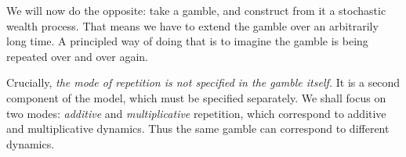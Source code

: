We will now do the opposite: take a gamble, and construct from it a stochastic wealth process.
That means we have to extend the gamble over an arbitrarily long time. A principled way of doing that
is to imagine the gamble is being repeated over and over again. 

%
%

Crucially, {\it the mode of repetition is not specified in the gamble itself.} It is a 
second component of the model, which must be specified separately. We shall 
focus on two modes: \textit{additive} and \textit{multiplicative} repetition, which
correspond to additive and multiplicative dynamics. Thus the same gamble can correspond to different dynamics.

